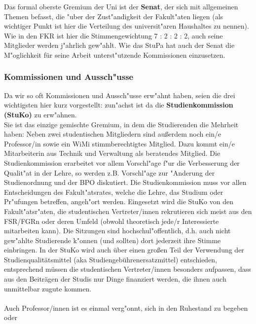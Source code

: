 Das formal oberste Gremium der Uni ist der \textbf{Senat}, der sich mit 
allgemeinen Themen befasst, die "uber der Zust"andigkeit der Fakult"aten 
liegen (als wichtiger Punkt ist hier die Verteilung des universit"aren 
Haushaltes zu nennen). Wie in den FKR ist hier die Stimmengewichtung 7 : 2 : 2 
: 2, auch seine Mitglieder werden j"ahrlich gew"ahlt. Wie das StuPa hat auch der 
Senat die M"oglichkeit für seine Arbeit unterst"utzende Kommissionen einzusetzen.

\subsubsection*{Kommissionen und Aussch"usse}

Da wir so oft Kommissionen und Aussch"usse erw"ahnt haben, seien die drei 
wichtigsten hier kurz vorgestellt: zun"achst ist da die 
\textbf{Studienkommission (StuKo)} zu erw"ahnen.\\ 
Sie ist das einzige gemischte Gremium, in dem die Studierenden die Mehrheit 
haben: Neben zwei studentischen Mitgliedern sind außerdem noch ein/e Professor/in sowie ein WiMi stimmberechtigtes Mitglied. 
Dazu kommt ein/e Mitarbeiterin aus Technik und Verwaltung als beratendes Mitglied.
Die Studienkommission erarbeitet vor allem Vorschl"age f"ur die Verbesserung der 
Qualit"at in der Lehre, so werden z.B. Vorschl"age zur "Anderung der 
Studienordnung und der BPO diskutiert. Die Studienkommission muss vor allen 
Entscheidungen des Fakult"atsrates, welche die Lehre, das Studium oder 
Pr"ufungen betreffen, angeh"ort werden. Eingesetzt wird die StuKo von den 
Fakult"atsr"aten, die studentischen Vertreter/innen rekrutieren sich meist aus den 
FSR/FGRn oder deren Umfeld (obwohl theoretisch jede/r Interessierte mitarbeiten 
kann). Die Sitzungen sind hochschul"offentlich, d.h. auch nicht gew"ahlte 
Studierende k"onnen (und sollten) dort jederzeit ihre Stimme einbringen.
In der StuKo wird auch über einen großen Teil der Verwendung der Studienqualitätsmittel (aka Studiengebührenersatzmittel)
entschieden, 
entsprechend müssen die studentischen Vertreter/innen besonders aufpassen, dass 
aus den Beiträgen der Studis nur Dinge finanziert werden, die ihnen auch unmittelbar zugute kommen.
\\\\
Auch Professor/innen ist es einmal verg"onnt, sich in den Ruhestand zu begeben oder 
